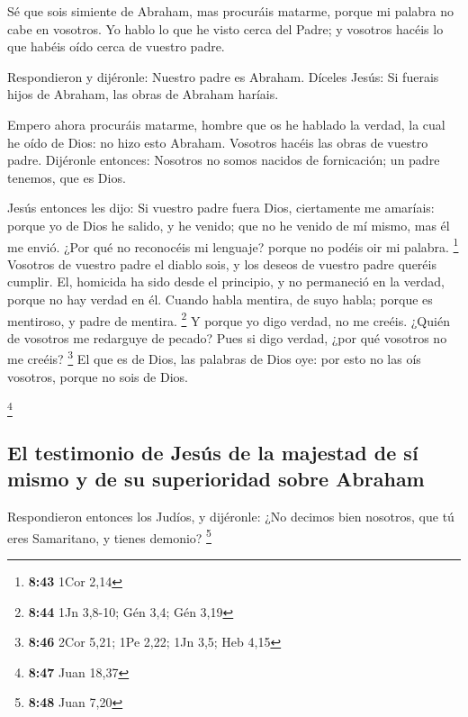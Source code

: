  Sé que sois simiente de Abraham, mas procuráis matarme,
porque mi palabra no cabe en vosotros.  Yo hablo lo que
he visto cerca del Padre; y vosotros hacéis lo que habéis oído cerca de
vuestro padre.

 Respondieron y dijéronle: Nuestro padre es Abraham.
Díceles Jesús: Si fuerais hijos de Abraham, las obras de Abraham
haríais.

 Empero ahora procuráis matarme, hombre que os he hablado
la verdad, la cual he oído de Dios: no hizo esto Abraham.
 Vosotros hacéis las obras de vuestro padre. Dijéronle
entonces: Nosotros no somos nacidos de fornicación; un padre tenemos,
que es Dios.

 Jesús entonces les dijo: Si vuestro padre fuera Dios,
ciertamente me amaríais: porque yo de Dios he salido, y he venido; que
no he venido de mí mismo, mas él me envió.  ¿Por qué no
reconocéis mi lenguaje? porque no podéis oir mi palabra. \footnote{\textbf{8:43}
  1Cor 2,14}  Vosotros de vuestro padre el diablo sois, y
los deseos de vuestro padre queréis cumplir. El, homicida ha sido desde
el principio, y no permaneció en la verdad, porque no hay verdad en él.
Cuando habla mentira, de suyo habla; porque es mentiroso, y padre de
mentira. \footnote{\textbf{8:44} 1Jn 3,8-10; Gén 3,4; Gén 3,19}
 Y porque yo digo verdad, no me creéis. 
¿Quién de vosotros me redarguye de pecado? Pues si digo verdad, ¿por qué
vosotros no me creéis? \footnote{\textbf{8:46} 2Cor 5,21; 1Pe 2,22; 1Jn
  3,5; Heb 4,15}  El que es de Dios, las palabras de Dios
oye: por esto no las oís vosotros, porque no sois de Dios.

\footnote{\textbf{8:47} Juan 18,37}

\hypertarget{el-testimonio-de-jesuxfas-de-la-majestad-de-suxed-mismo-y-de-su-superioridad-sobre-abraham}{%
\subsection{El testimonio de Jesús de la majestad de sí mismo y de su
superioridad sobre
Abraham}\label{el-testimonio-de-jesuxfas-de-la-majestad-de-suxed-mismo-y-de-su-superioridad-sobre-abraham}}

 Respondieron entonces los Judíos, y dijéronle: ¿No
decimos bien nosotros, que tú eres Samaritano, y tienes demonio?
\footnote{\textbf{8:48} Juan 7,20}


